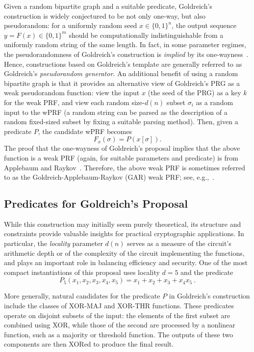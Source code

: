 Given a random bipartite graph and a suitable predicate, Goldreich's construction is widely conjectured to be not only one-way, but also pseudorandom: for a uniformly random seed $x \in \{0,1\}^n$, the output sequence $y = F(x) \in \{0,1\}^m$ should be computationally indistinguishable from a uniformly random string of the same length. In fact, in some parameter regimes, the pseudorandomness of Goldreich's construction is \emph{implied} by its one-wayness~\cite{TCC:AppRay16b}. Hence, constructions based on Goldreich's template are generally referred to as  Goldreich's \emph{pseudorandom generator}. An additional benefit of using a random bipartite graph is that it provides an alternative view of Goldreich's PRG as a weak pseudorandom function: view the input $x$ (the seed of the PRG) as a key $k$ for the weak PRF, and view each random size-$d(n)$ subset $\sigma_i$ as a random input to the wPRF (a random string can be parsed as the description of a random fixed-sized subset by fixing a suitable parsing method). Then, given a predicate $P$, the candidate wPRF becomes
\[F_x(\sigma) = P(x[\sigma]). \]
The proof that the one-wayness of Goldreich's proposal implies that the above function is a weak PRF (again, for suitable parameters and predicate) is from Applebaum and Raykov~\cite{TCC:AppRay16b}. Therefore, the above weak PRF is sometimes referred to as the Goldreich-Applebaum-Raykov (GAR) weak PRF; see, e.g.,~\cite{EC:BCMPR24,AC:CDDKS24}.

\subsection{Predicates for Goldreich's Proposal}

While this construction may initially seem purely theoretical, its structure and constraints provide valuable insights for practical cryptographic applications. In particular, the \emph{locality} parameter $d(n)$ serves as a measure of the circuit's arithmetic depth or of the complexity of the circuit implementing the functions, and plays an important role in balancing efficiency and security. One of the most compact instantiations of this proposal uses locality $d = 5$ and the predicate
\[
P_5(x_1, x_2, x_3, x_4, x_5) = x_1 + x_2 + x_3 + x_4 x_5~.
\]

More generally, natural candidates for the predicate $P$ in Goldreich’s construction include the classes of \textsf{XOR-MAJ} and \textsf{XOR-THR} functions. These predicates operate on disjoint subsets of the input: the elements of the first subset are combined using XOR, while those of the second are processed by a nonlinear function, such as a majority or threshold function. The outputs of these two components are then XORed to produce the final result.

